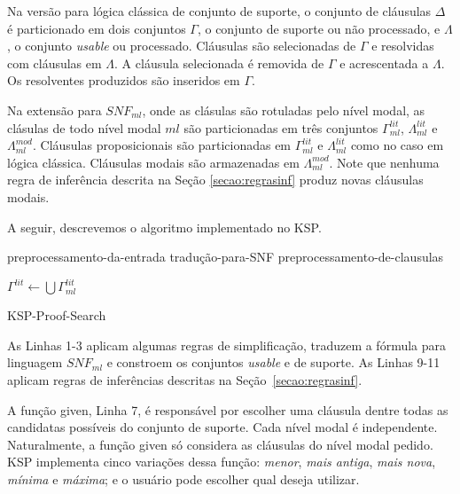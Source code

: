 Na versão para lógica clássica de conjunto de suporte, o conjunto de cláusulas $\Delta$ é particionado em dois conjuntos $\Gamma$, o conjunto de suporte ou não processado, e $\Lambda$, o conjunto \textit{usable} ou processado. Cláusulas são selecionadas de $\Gamma$ e resolvidas com cláusulas em $\Lambda$. A cláusula selecionada é removida de $\Gamma$ e acrescentada a $\Lambda$. Os resolventes produzidos são inseridos em $\Gamma$.

Na extensão para $SNF_{ml}$, onde as clásulas são rotuladas pelo nível modal, as clásulas de todo nível modal $ml$ são particionadas em três conjuntos $\Gamma^{lit}_{ml}$, $\Lambda^{lit}_{ml}$ e $\Lambda^{mod}_{ml}$. Cláusulas proposicionais são particionadas em $\Gamma^{lit}_{ml}$ e $\Lambda^{lit}_{ml}$ como no caso em lógica clássica. Cláusulas modais são armazenadas em $\Lambda^{mod}_{ml}$. Note que nenhuma regra de inferência descrita na Seção \ref{secao:regrasinf} produz novas cláusulas modais.

A seguir, descrevemos o algoritmo implementado no KSP.

\begin{algorithm}[H]
	\SetAlgoLined
	preprocessamento-da-entrada\;
	tradução-para-SNF\;
	preprocessamento-de-clausulas\;

	$\Gamma^{lit} \leftarrow \bigcup \Gamma^{lit}_{ml}$\;
	\caption{KSP-Proof-Search}
\end{algorithm}

As Linhas 1-3 aplicam algumas regras de simplificação, traduzem a fórmula para linguagem $SNF_{ml}$ e constroem os conjuntos \textit{usable} e de suporte. As Linhas 9-11 aplicam regras de inferências descritas na Seção~\ref{secao:regrasinf}.

A função {\sf given}, Linha 7, é responsável por escolher uma cláusula dentre todas as candidatas possíveis do conjunto de suporte. Cada nível modal é independente. Naturalmente, a função {\sf given} só considera as cláusulas do nível modal pedido. KSP implementa cinco variações dessa função: \textit{menor}, \textit{mais antiga}, \textit{mais nova}, \textit{mínima} e \textit{máxima}; e o usuário pode escolher qual deseja utilizar.

